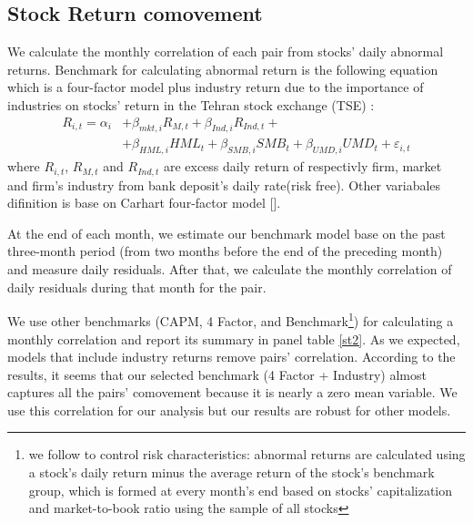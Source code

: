 \FloatBarrier
\subsection{{Stock Return comovement}}
\label{comovement}

	We calculate the monthly correlation of each pair from stocks' daily abnormal returns. Benchmark for calculating abnormal return is the following equation which is a four-factor model plus industry return due to the importance of industries on stocks' return in the Tehran stock exchange (TSE) :
	\begin{equation}
		\begin{split}
			R_{i,t} =\alpha _{i}&+\beta _{mkt,i}{\mathit {R}}_{M,t} + \beta_{Ind,i}{\mathit {R}}_{Ind,t} + \\
			&+\beta _{HML,i}{\mathit {HML}}_{t}+\beta _{SMB,i}{\mathit {SMB}}_{t}+\beta _{UMD,i}{\mathit {UMD}}_{t}+ \varepsilon_{i,t}
		\end{split}
		\label{e5Factor}
	\end{equation}
	where $ R_{i,t} $, $ R_{M,t} $ and $ R_{Ind,t} $ are excess daily return of respectivly  firm, market and firm's industry from bank deposit's daily rate(risk free). Other variabales difinition is base on Carhart four-factor model [\cite{Carhart4Factor}].
	
	At the end of each month, we estimate our benchmark model base on the past three-month period (from two months before the end of the preceding month) and measure daily residuals.  After that, we calculate the monthly correlation of daily residuals during that month for the pair.
	
	We use other benchmarks (CAPM, 4 Factor, and Benchmark\footnote{we follow \cite{daniel1997measuring} to control risk characteristics: abnormal returns are calculated using a stock’s daily return minus the average return of
	the stock’s benchmark group, which is formed at every month’s end based on stocks’ capitalization and market-to-book ratio using the sample of all stocks}) for calculating a monthly correlation and report its summary in panel  table \ref{st2}. 
	As we expected,  models that include industry returns remove pairs' correlation. According to the results, it seems that our selected benchmark (4 Factor + Industry) almost captures all the pairs' comovement because it is nearly a zero mean variable. We use this correlation for our analysis but our results are robust for other models.
	
	
	

